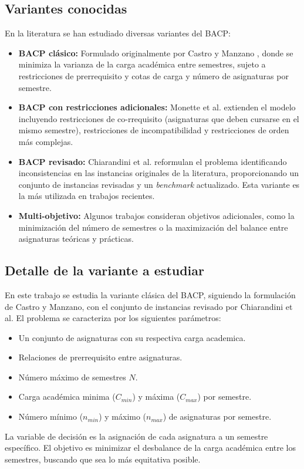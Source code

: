 \documentclass[letter, 10pt]{article}
\begin{document}
\subsection{Variantes conocidas}
En la literatura se han estudiado diversas variantes del BACP:
\begin{itemize}
    \item \textbf{BACP cl\'asico:} Formulado originalmente por Castro y Manzano \cite{Castro2001}, donde se minimiza la varianza de la carga acad\'emica entre semestres, sujeto a restricciones de prerrequisito y cotas de carga y n\'umero de asignaturas por semestre.
    \item \textbf{BACP con restricciones adicionales:} Monette et al. \cite{Monette2007} extienden el modelo incluyendo restricciones de co-rrequisito (asignaturas que deben cursarse en el mismo semestre), restricciones de incompatibilidad y restricciones de orden m\'as complejas.
    \item \textbf{BACP revisado:} Chiarandini et al. \cite{Chiarandini2012} reformulan el problema identificando inconsistencias en las instancias originales de la literatura, proporcionando un conjunto de instancias revisadas y un \textit{benchmark} actualizado. Esta variante es la m\'as utilizada en trabajos recientes.
    \item \textbf{Multi-objetivo:} Algunos trabajos consideran objetivos adicionales, como la minimizaci\'on del n\'umero de semestres o la maximizaci\'on del balance entre asignaturas te\'oricas y pr\'acticas.
\end{itemize}
\subsection{Detalle de la variante a estudiar}
En este trabajo se estudia la variante cl\'asica del BACP, siguiendo la formulaci\'on de Castro y Manzano, con el conjunto de instancias revisado por Chiarandini et al. El problema se caracteriza por los siguientes par\'ametros:

\begin{itemize}
    \item Un conjunto de asignaturas con su respectiva carga academica.
    \item Relaciones de prerrequisito entre asignaturas.
    \item N\'umero m\'aximo de semestres $N$.
    \item Carga acad\'emica minima ($C_{min}$) y m\'axima ($C_{max}$) por semestre.
    \item N\'umero m\'inimo ($n_{min}$) y m\'aximo ($n_{max}$) de asignaturas por semestre.
\end{itemize}
La variable de decisi\'on es la asignaci\'on de cada asignatura a un semestre espec\'ifico. El objetivo es minimizar el desbalance de la carga acad\'emica entre los semestres, buscando que sea lo m\'as equitativa posible.\\
\end{document}
